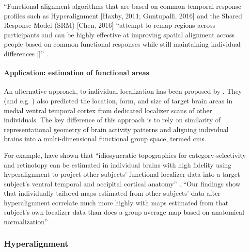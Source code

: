 %
``Functional alignment algorithms that are based on common temporal response
profiles such as Hyperalignment [Haxby, 2011; Guntupalli, 2016] and the Shared
Response Model (SRM) [Chen, 2016] ``attempt to remap regions across participants
and can be highly effective at improving spatial alignment across people based
on common functional responses while still maintaining individual differences
[\citep{feilong2018reliable}]'' \citep{chang2021endogenous}.


\paragraph{Application: estimation of functional areas}




An alternative approach, to individual localization has been proposed by
\citet{haxby2011common}.
%
They (and e.g. \citet{jiahui2020predicting}) also predicted the location, form,
and size of target brain areas in medial ventral temporal cortex from dedicated
localizer scans of other individuals.
%
The key difference of this approach is to rely on similarity of representational
geometry of brain activity patterns and aligning individual brains into a
multi-dimensional functional group space, termed \ac{cms}.

%
For example, \citet{haxby2011common, guntupalli2016model} have shown that
``idiosyncratic topographies for category-selectivity and retinotopy can be
estimated in individual brains with high fidelity using hyperalignment to
project other subjects' functional localizer data into a target subject's
ventral temporal and occipital cortical anatomy'' \citep{jiahui2020predicting}.
%
``Our findings show that individually-tailored maps estimated from other
subjects’ data after hyperalignment correlate much more highly with maps
estimated from that subject's own localizer data than does a group average map
based on anatomical normalization'' \citep{jiahui2020predicting}.


\subsubsection{Hyperalignment}

